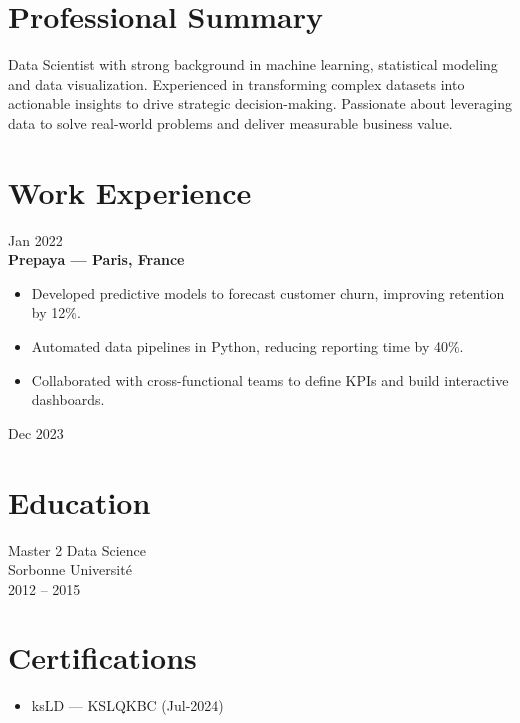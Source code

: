 \documentclass[10pt,letterpaper]{article}
\begin{document}
\begin{paracol}{2}
\begin{rightcolumn}
\section*{Professional Summary}
Data Scientist with strong background in machine learning, statistical modeling and data visualization. Experienced in transforming complex datasets into actionable insights to drive strategic decision-making. Passionate about leveraging data to solve real-world problems and deliver measurable business value.

\vspace{0.4in}
\section*{Work Experience}

\begin{tcolorbox}
  \begin{minipage}[t]{0.48\linewidth}
    Jan 2022\\
    \textbf{Prepaya — Paris, France}\\
    \begin{itemize}
      \item Developed predictive models to forecast customer churn, improving retention by 12\%.
      \item Automated data pipelines in Python, reducing reporting time by 40\%.
      \item Collaborated with cross-functional teams to define KPIs and build interactive dashboards.
    \end{itemize}
  \end{minipage}\hfill
  \begin{minipage}[t]{0.48\linewidth}\raggedleft
    Dec 2023
  \end{minipage}
\end{tcolorbox}

\vspace{0.5in}
\section*{Education}
\begin{tcolorbox}[colback=white,boxrule=1pt,colframe=primary]
  Master 2 Data Science\\
  Sorbonne Université\\
  2012 – 2015
\end{tcolorbox}

\section*{Certifications}
\begin{itemize}
  \item ksLD — KSLQKBC (Jul-2024)
\end{itemize}

\end{rightcolumn}
\end{paracol}
\end{document}
